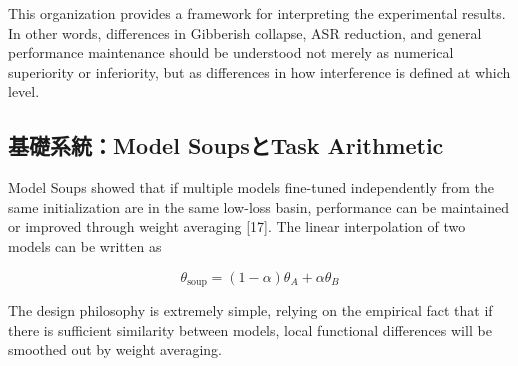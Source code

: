 \documentclass{article}
\begin{document}
This organization provides a framework for interpreting the experimental results. In other words, differences in Gibberish collapse, ASR reduction, and general performance maintenance should be understood not merely as numerical superiority or inferiority, but as differences in how interference is defined at which level.


\subsection{基礎系統：Model SoupsとTask Arithmetic}









Model Soups showed that if multiple models fine-tuned independently from the same initialization are in the same low-loss basin, performance can be maintained or improved through weight averaging [17]. The linear interpolation of two models can be written as

\[
\theta_{\mathrm{soup}}=(1-\alpha)\theta_A+\alpha\theta_B
\tag{1}
\]

The design philosophy is extremely simple, relying on the empirical fact that if there is sufficient similarity between models, local functional differences will be smoothed out by weight averaging.
\end{document}
